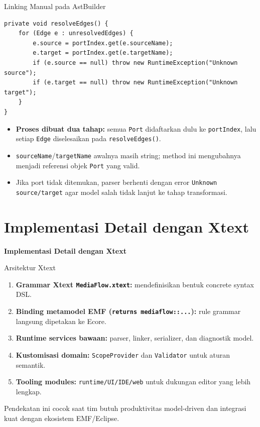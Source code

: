 \documentclass[aspectratio=169, table]{beamer}
\begin{document}
\begin{frame}[fragile]{Linking Manual pada AstBuilder}
\vspace{10pt}
\begin{lstlisting}[style=JavaStyle, basicstyle=\ttfamily\scriptsize]
private void resolveEdges() {
    for (Edge e : unresolvedEdges) {
        e.source = portIndex.get(e.sourceName);
        e.target = portIndex.get(e.targetName);
        if (e.source == null) throw new RuntimeException("Unknown source");
        if (e.target == null) throw new RuntimeException("Unknown target");
    }
}
\end{lstlisting}
\vspace{2pt}
\small
\begin{itemize}
  \item \textbf{Proses dibuat dua tahap:} semua \texttt{Port} didaftarkan dulu ke \texttt{portIndex}, lalu setiap \texttt{Edge} diselesaikan pada \texttt{resolveEdges()}.
  \item \texttt{sourceName}/\texttt{targetName} awalnya masih string; method ini mengubahnya menjadi referensi objek \texttt{Port} yang valid.
  \item Jika port tidak ditemukan, parser berhenti dengan error \texttt{Unknown source/target} agar model salah tidak lanjut ke tahap transformasi.
\end{itemize}
\end{frame}

\section{Implementasi Detail dengan Xtext}
\begin{frame}{\hfill}
	\centering
	\Huge{\textbf{Implementasi Detail dengan Xtext}}
\end{frame}

\begin{frame}{Arsitektur Xtext}
\vspace{4pt}
\begin{enumerate}
  \item \textbf{Grammar Xtext \texttt{MediaFlow.xtext}:} mendefinisikan bentuk concrete syntax DSL.
  \item \textbf{Binding metamodel EMF (\texttt{returns mediaflow::...}):} rule grammar langsung dipetakan ke Ecore.
  \item \textbf{Runtime services bawaan:} parser, linker, serializer, dan diagnostik model.
  \item \textbf{Kustomisasi domain:} \texttt{ScopeProvider} dan \texttt{Validator} untuk aturan semantik.
  \item \textbf{Tooling modules:} \texttt{runtime/UI/IDE/web} untuk dukungan editor yang lebih lengkap.
\end{enumerate}
\vspace{4pt}
\small
Pendekatan ini cocok saat tim butuh produktivitas model-driven dan integrasi kuat dengan ekosistem EMF/Eclipse.
\end{frame}
\end{document}
